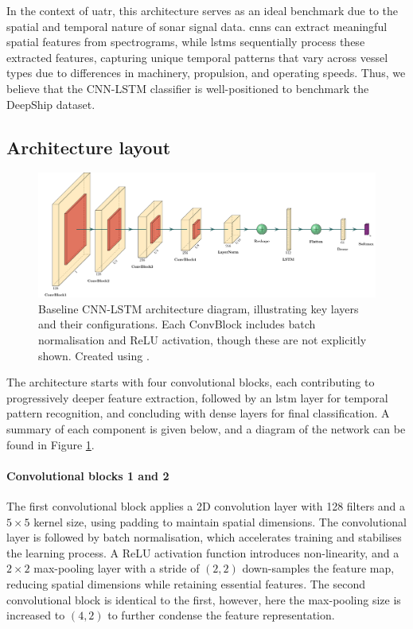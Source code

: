 In the context of \acrshort{uatr}, this architecture serves as an ideal benchmark due to the spatial and temporal nature of sonar signal data. \acrshort{cnn}s can extract meaningful spatial features from spectrograms, while \acrshort{lstm}s sequentially process these extracted features, capturing unique temporal patterns that vary across vessel types due to differences in machinery, propulsion, and operating speeds. Thus, we believe that the CNN-LSTM classifier is well-positioned to benchmark the DeepShip dataset. 

\subsection{Architecture layout}

\begin{figure}
    \centering
    \includegraphics[width=\linewidth]{img/ch3/architecture_diagram.pdf}
    \caption{Baseline CNN-LSTM architecture diagram, illustrating key layers and their configurations. Each ConvBlock includes batch normalisation and ReLU activation, though these are not explicitly shown. Created using \cite{haris_iqbal_plotneuralnet_2020}.}
    \label{fig:cnn-lstm-architecture}
\end{figure}

The architecture starts with four convolutional blocks, each contributing to progressively deeper feature extraction, followed by an \acrshort{lstm} layer for temporal pattern recognition, and concluding with dense layers for final classification. A summary of each component is given below, and a diagram of the network can be found in Figure \ref{fig:cnn-lstm-architecture}.

\paragraph{Convolutional blocks 1 and 2} The first convolutional block applies a 2D convolution layer with 128 filters and a $5\times5$ kernel size, using padding to maintain spatial dimensions. The convolutional layer is followed by batch normalisation, which accelerates training and stabilises the learning process. A ReLU activation function introduces non-linearity, and a $2\times2$ max-pooling layer with a stride of $(2,2)$ down-samples the feature map, reducing spatial dimensions while retaining essential features. The second convolutional block is identical to the first, however, here the max-pooling size is increased to $(4,2)$ to further condense the feature representation.

